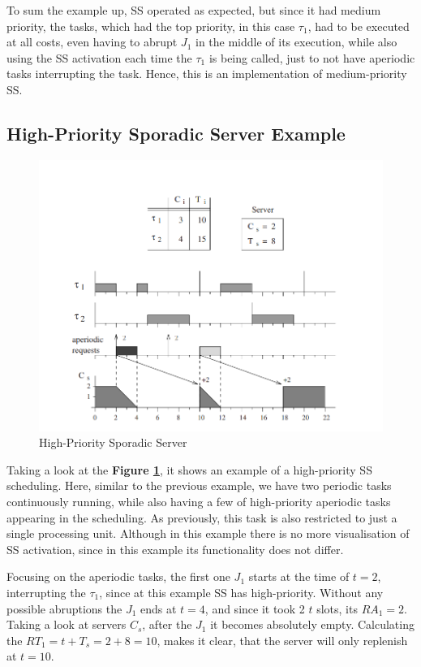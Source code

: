 \documentclass[conference]{IEEEtran}
\begin{document}
To sum the example up, SS operated as expected, but since it had medium priority, the tasks, which had the top priority, in this case $\tau_1$, had to be executed at all costs, even having to abrupt $J_1$ in the middle of its execution, while also using the SS activation each time the $\tau_1$ is being called, just to not have aperiodic tasks interrupting the task. Hence, this is an implementation of medium-priority SS.

\subsection{High-Priority Sporadic Server Example}

\begin{figure}[htbp]
\centerline{\includegraphics[scale=.39]{Example2.png}}
\caption{High-Priority Sporadic Server \cite{b1}}
\label{example2}
\end{figure}

Taking a look at the \textbf{Figure \ref{example2}}, it shows an example of a high-priority SS scheduling. Here, similar to the previous example, we have two periodic tasks continuously running, while also having a few of high-priority aperiodic tasks appearing in the scheduling. As previously, this task is also restricted to just a single processing unit. Although in this example there is no more visualisation of SS activation, since in this example its functionality does not differ.

Focusing on the aperiodic tasks, the first one $J_1$ starts at the time of $t = 2$, interrupting the $\tau_1$, since at this example SS has high-priority. Without any possible abruptions the $J_1$ ends at $t = 4$, and since it took 2 $t$ slots, its $RA_1 = 2$. Taking a look at servers $C_s$, after the $J_1$ it becomes absolutely empty. Calculating the $RT_1 = t + T_s = 2 + 8 = 10$, makes it clear, that the server will only replenish at $t = 10$.
\end{document}
